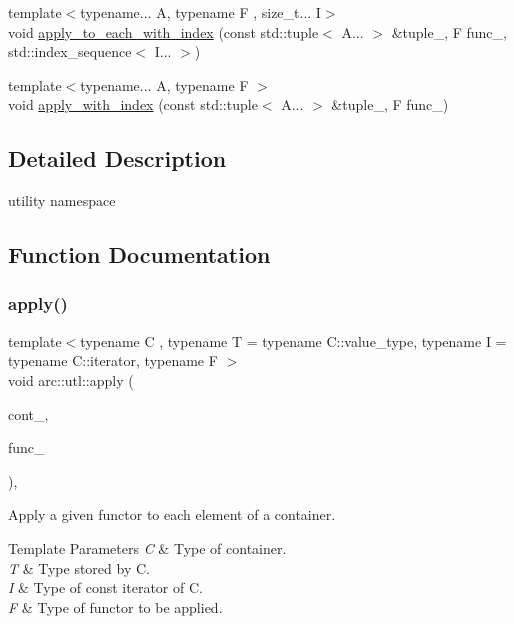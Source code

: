 \begin{DoxyCompactItemize}
\item 
{\footnotesize template$<$typename... A, typename F , size\+\_\+t... I$>$ }\\void \mbox{\hyperlink{namespacearc_1_1utl_a6330262543d471ad23a1a70ea3a47b53}{apply\+\_\+to\+\_\+each\+\_\+with\+\_\+index}} (const std\+::tuple$<$ A... $>$ \&tuple\+\_\+, F func\+\_\+, std\+::index\+\_\+sequence$<$ I... $>$)
\item 
{\footnotesize template$<$typename... A, typename F $>$ }\\void \mbox{\hyperlink{namespacearc_1_1utl_ae57e12a4fd6beeb3a1a40bfd461c3a87}{apply\+\_\+with\+\_\+index}} (const std\+::tuple$<$ A... $>$ \&tuple\+\_\+, F func\+\_\+)
\end{DoxyCompactItemize}


\subsection{Detailed Description}
utility namespace 

\subsection{Function Documentation}
\mbox{\label{namespacearc_1_1utl_a7e7db05c1cbc593d3bf9361621f763f3}} 
\subsubsection{\texorpdfstring{apply()}{apply()}\hspace{0.1cm}{\footnotesize\ttfamily [1/6]}}
{\footnotesize\ttfamily template$<$typename C , typename T  = typename C\+::value\+\_\+type, typename I  = typename C\+::iterator, typename F $>$ \\
void arc\+::utl\+::apply (\begin{DoxyParamCaption}\item[{C \&}]{cont\+\_\+,  }\item[{F}]{func\+\_\+ }\end{DoxyParamCaption})\hspace{0.3cm}{\ttfamily [inline]}, {\ttfamily [noexcept]}}

Apply a given functor to each element of a container.


\begin{DoxyTemplParams}{Template Parameters}
{\em C} & Type of container. \\
\hline
{\em T} & Type stored by C. \\
\hline
{\em I} & Type of const iterator of C. \\
\hline
{\em F} & Type of functor to be applied.\\
\hline
\end{DoxyTemplParams}


